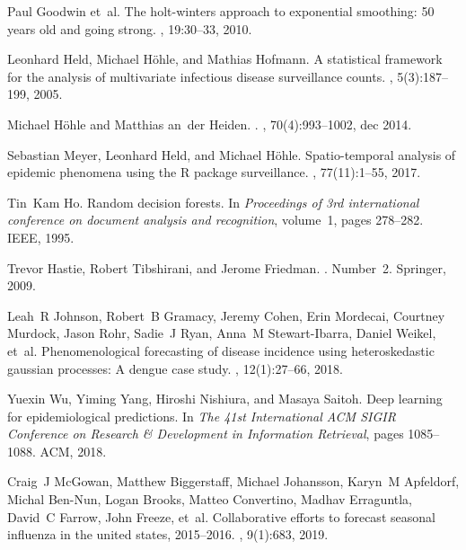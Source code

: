 \documentclass[a4paper]{article}
\begin{document}
\begin{thebibliography}{100}
Paul Goodwin et~al.
\newblock The holt-winters approach to exponential smoothing: 50 years old and
  going strong.
, 19:30--33, 2010.

Leonhard Held, Michael H{\"o}hle, and Mathias Hofmann.
\newblock A statistical framework for the analysis of multivariate infectious
  disease surveillance counts.
, 5(3):187--199, 2005.

Michael H{\"{o}}hle and Matthias an~der Heiden.
.
, 70(4):993--1002, dec 2014.

Sebastian Meyer, Leonhard Held, and Michael H{\"o}hle.
\newblock Spatio-temporal analysis of epidemic phenomena using the {R} package
  {surveillance}.
, 77(11):1--55, 2017.

Tin~Kam Ho.
\newblock Random decision forests.
\newblock In {\em Proceedings of 3rd international conference on document
  analysis and recognition}, volume~1, pages 278--282. IEEE, 1995.

Trevor Hastie, Robert Tibshirani, and Jerome Friedman.
.
\newblock Number~2. Springer, 2009.

Leah~R Johnson, Robert~B Gramacy, Jeremy Cohen, Erin Mordecai, Courtney
  Murdock, Jason Rohr, Sadie~J Ryan, Anna~M Stewart-Ibarra, Daniel Weikel,
  et~al.
\newblock Phenomenological forecasting of disease incidence using
  heteroskedastic gaussian processes: A dengue case study.
, 12(1):27--66, 2018.

Yuexin Wu, Yiming Yang, Hiroshi Nishiura, and Masaya Saitoh.
\newblock Deep learning for epidemiological predictions.
\newblock In {\em The 41st International ACM SIGIR Conference on Research \&
  Development in Information Retrieval}, pages 1085--1088. ACM, 2018.

Craig~J McGowan, Matthew Biggerstaff, Michael Johansson, Karyn~M Apfeldorf,
  Michal Ben-Nun, Logan Brooks, Matteo Convertino, Madhav Erraguntla, David~C
  Farrow, John Freeze, et~al.
\newblock Collaborative efforts to forecast seasonal influenza in the united
  states, 2015--2016.
, 9(1):683, 2019.


\end{thebibliography}
\end{document}
